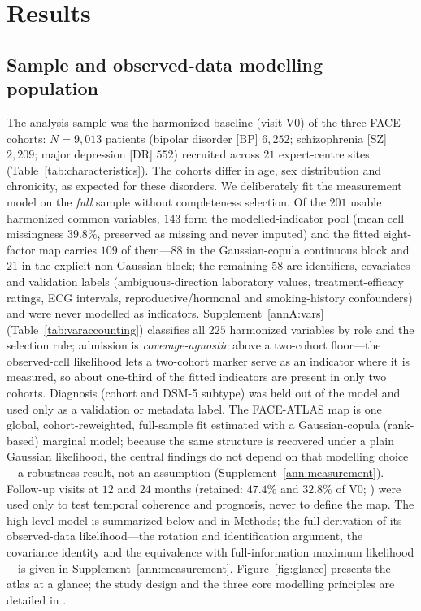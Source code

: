 \section{Results}

\subsection{Sample and observed-data modelling population}

The analysis sample was the harmonized baseline (visit V0) of the three FACE
cohorts: $N=9{,}013$ patients (bipolar disorder [BP] $6{,}252$; schizophrenia [SZ]
$2{,}209$; major depression [DR] $552$) recruited across $21$ expert-centre sites
(Table~\ref{tab:characteristics}). The cohorts differ in age, sex distribution and
chronicity, as expected for these disorders. We deliberately fit the measurement
model on the \emph{full} sample without completeness selection. Of the $201$ usable
harmonized common variables, $143$ form the modelled-indicator pool (mean cell
missingness $39.8\%$, preserved as missing and never imputed) and the fitted eight-factor
map carries $109$ of them---$88$ in the Gaussian-copula continuous block and $21$ in the
explicit non-Gaussian block; the remaining $58$ are identifiers, covariates and validation
labels (ambiguous-direction laboratory values, treatment-efficacy ratings, ECG intervals,
reproductive/hormonal and smoking-history confounders) and were never modelled as
indicators. Supplement~\ref{annA:vars} (Table~\ref{tab:varaccounting}) classifies all $225$
harmonized variables by role and the selection rule; admission is \emph{coverage-agnostic}
above a two-cohort floor---the observed-cell likelihood lets a two-cohort marker serve as an
indicator where it is measured, so about one-third of the fitted indicators are present in
only two cohorts. Diagnosis (cohort and DSM-5 subtype) was held out of the model and used only
as a validation or metadata label. The FACE-ATLAS map is one global,
cohort-reweighted, full-sample fit estimated with a Gaussian-copula
(rank-based) marginal model; because the same structure is recovered under a plain
Gaussian likelihood, the central findings do not depend on that modelling choice---a
robustness result, not an assumption (Supplement~\ref{ann:measurement}). Follow-up visits
at $12$ and $24$ months (retained: $47.4\%$ and $32.8\%$ of V0; )
were used only to test temporal coherence and prognosis, never to define the map. The
high-level model is summarized below and in Methods; the full derivation of its observed-data
likelihood---the rotation and identification argument, the covariance identity and the
equivalence with full-information maximum likelihood---is
given in Supplement~\ref{ann:measurement}. Figure~\ref{fig:glance} presents the atlas at a
glance; the study design and the three core modelling principles are detailed in
.

